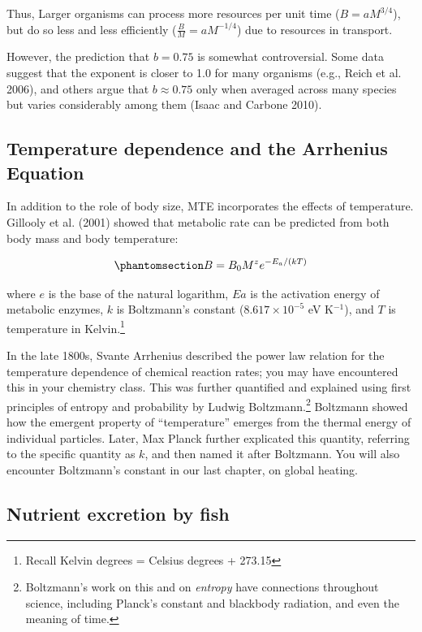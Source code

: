 \documentclass[
  letterpaper,
  DIV=11,
  numbers=noendperiod]{scrreprt}
\begin{document}
Thus, Larger organisms can process more resources per unit time
(\(B=aM^{3/4}\)), but do so less and less efficiently
(\(\frac{B}{M}=aM^{-1/4}\)) due to resources in transport.

However, the prediction that \(b = 0.75\) is somewhat controversial.
Some data suggest that the exponent is closer to 1.0 for many organisms
(e.g., Reich et al. 2006), and others argue that \(b \approx 0.75\) only
when averaged across many species but varies considerably among them
(Isaac and Carbone 2010).

\subsection{Temperature dependence and the Arrhenius
Equation}\label{temperature-dependence-and-the-arrhenius-equation}

In addition to the role of body size, MTE incorporates the effects of
temperature. Gillooly et al. (2001) showed that metabolic rate can be
predicted from both body mass and body temperature:

\begin{equation}\phantomsection\label{eq-mte-full}{B = B_0 M^z e^{-E_a/(kT)}}\end{equation}

where \(e\) is the base of the natural logarithm, \(Ea\) is the
activation energy of metabolic enzymes, \(k\) is Boltzmann's constant
(\(8.617 \times 10^{-5}\) eV K\(^{-1}\)), and \(T\) is temperature in
Kelvin.\footnote{Recall Kelvin degrees = Celsius degrees + 273.15}

In the late 1800s, Svante Arrhenius described the power law relation for
the temperature dependence of chemical reaction rates; you may have
encountered this in your chemistry class. This was further quantified
and explained using first principles of entropy and probability by
Ludwig Boltzmann.\footnote{Boltzmann's work on this and on
  \emph{entropy} have connections throughout science, including Planck's
  constant and blackbody radiation, and even the meaning of time.}
Boltzmann showed how the emergent property of ``temperature'' emerges
from the thermal energy of individual particles. Later, Max Planck
further explicated this quantity, referring to the specific quantity as
\(k\), and then named it after Boltzmann. You will also encounter
Boltzmann's constant in our last chapter, on global heating.

\subsection{Nutrient excretion by
fish}\label{nutrient-excretion-by-fish}
\end{document}
